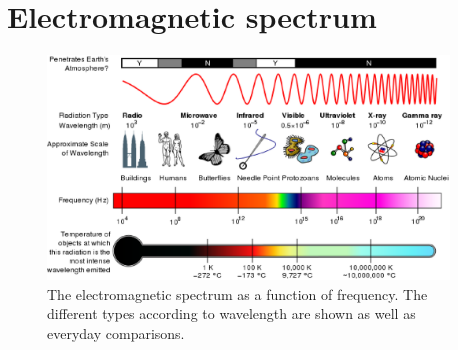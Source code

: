 

\section{Electromagnetic spectrum}
\label{p:em:emr12:ems}




\begin{figure}[htbp]
\begin{center}
\includegraphics[width=0.95\textwidth]{../../epsimages/EM_Spectrum_Properties_edit.eps}%
\caption{The electromagnetic spectrum as a function of frequency. The different types according to wavelength are shown as well as everyday comparisons.}
\end{center}
\end{figure}


